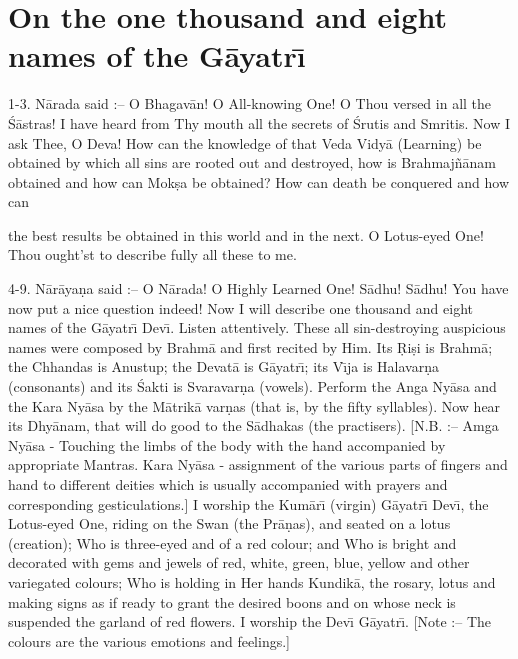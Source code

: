 \chapter{On the one thousand and eight names of the G\=ayatr\={\i}}

1-3. N\=arada said :-- O Bhagav\=an! O All-knowing One! O Thou versed in all the \'S\=astras! I have heard from Thy mouth all the secrets of \'Srutis and Smritis. Now I ask Thee, O Deva! How can the knowledge of that Veda Vidy\=a (Learning) be obtained by which all sins are rooted out and destroyed, how is Brahmaj\~n\=anam obtained and how can Mok\d{s}a be obtained? How can death be conquered and how can

the best results be obtained in this world and in the next. O Lotus-eyed One! Thou ought'st to describe fully all these to me.

4-9. N\=ar\=aya\d{n}a said :-- O N\=arada! O Highly Learned One! S\=adhu! S\=adhu! You have now put a nice question indeed! Now I will describe one thousand and eight names of the G\=ayatr\={\i} Dev\={\i}. Listen attentively. These all sin-destroying auspicious names were composed by Brahm\=a and first recited by Him. Its \d{R}i\d{s}i is Brahm\=a; the Chhandas is Anustup; the Devat\=a is G\=ayatr\={\i}; its V\={\i}ja is Halavar\d{n}a (consonants) and its \'Sakti is Svaravar\d{n}a (vowels). Perform the Anga Ny\=asa and the Kara Ny\=asa by the M\=atrik\=a var\d{n}as (that is, by the fifty syllables). Now hear its Dhy\=anam, that will do good to the S\=adhakas (the practisers). [N.B. :-- Amga Ny\=asa - Touching the limbs of the body with the hand accompanied by appropriate Mantras. Kara Ny\=asa - assignment of the various parts of fingers and hand to different deities which is usually accompanied with prayers and corresponding gesticulations.] I worship the Kum\=ar\={\i} (virgin) G\=ayatr\={\i} Dev\={\i}, the Lotus-eyed One, riding on the Swan (the Pr\=a\d{n}as), and seated on a lotus (creation); Who is three-eyed and of a red colour; and Who is bright and decorated with gems and jewels of red, white, green, blue, yellow and other variegated colours; Who is holding in Her hands Kundik\=a, the rosary, lotus and making signs as if ready to grant the desired boons and on whose neck is suspended the garland of red flowers. I worship the Dev\={\i} G\=ayatr\={\i}. [Note :-- The colours are the various emotions and feelings.]

